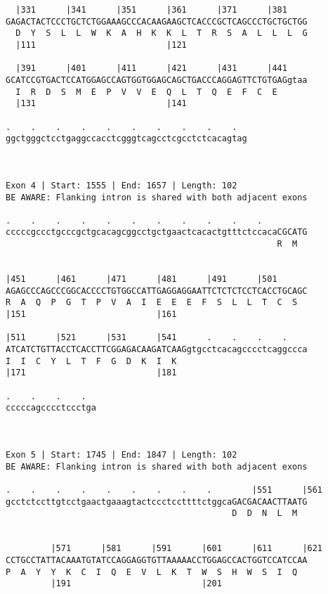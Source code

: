 \documentclass{article}
\begin{document}
\begin{Verbatim}
  |331      |341      |351      |361      |371      |381    
GAGACTACTCCCTGCTCTGGAAAGCCCACAAGAAGCTCACCCGCTCAGCCCTGCTGCTGG
  D  Y  S  L  L  W  K  A  H  K  K  L  T  R  S  A  L  L  L  G
  |111                          |121                        
  
  |391      |401      |411      |421      |431      |441    
GCATCCGTGACTCCATGGAGCCAGTGGTGGAGCAGCTGACCCAGGAGTTCTGTGAGgtaa
  I  R  D  S  M  E  P  V  V  E  Q  L  T  Q  E  F  C  E      
  |131                          |141                        
  
.    .    .    .    .    .    .    .    .    .  
ggctgggctcctgaggccacctcgggtcagcctcgcctctcacagtag
                                                
                                                
 
Exon 4 | Start: 1555 | End: 1657 | Length: 102
BE AWARE: Flanking intron is shared with both adjacent exons
 
.    .    .    .    .    .    .    .    .    .    .         
cccccgccctgcccgctgcacagcggcctgctgaactcacactgtttctccacaCGCATG
                                                      R  M  
                                                            
  
|451      |461      |471      |481      |491      |501      
AGAGCCCAGCCCGGCACCCCTGTGGCCATTGAGGAGGAATTCTCTCTCCTCACCTGCAGC
R  A  Q  P  G  T  P  V  A  I  E  E  E  F  S  L  L  T  C  S  
|151                          |161                          
  
|511      |521      |531      |541      .    .    .    .    
ATCATCTGTTACCTCACCTTCGGAGACAAGATCAAGgtgcctcacagcccctcaggccca
I  I  C  Y  L  T  F  G  D  K  I  K                          
|171                          |181                          
  
.    .    .    .  
cccccagcccctccctga
                  
                  
 
Exon 5 | Start: 1745 | End: 1847 | Length: 102
BE AWARE: Flanking intron is shared with both adjacent exons
 
.    .    .    .    .    .    .    .    .        |551      |561
gcctctccttgtcctgaactgaaagtactccctccttttctggcaGACGACAACTTAATG
                                             D  D  N  L  M  
                                                            
  
         |571      |581      |591      |601      |611      |621
CCTGCCTATTACAAATGTATCCAGGAGGTGTTAAAAACCTGGAGCCACTGGTCCATCCAA
P  A  Y  Y  K  C  I  Q  E  V  L  K  T  W  S  H  W  S  I  Q  
         |191                          |201                 
  

\end{Verbatim}
\end{document}
